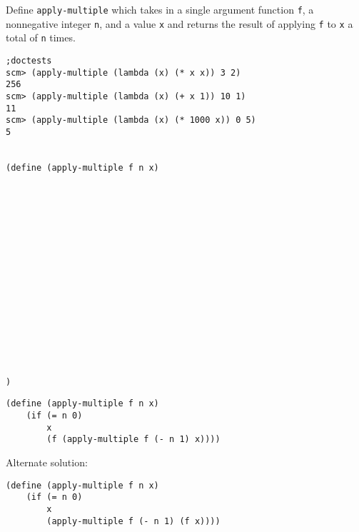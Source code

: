 \question Define \lstinline{apply-multiple} which takes in a single argument function \lstinline{f},
a nonnegative integer \lstinline{n}, and a value \lstinline{x} and returns the result of applying
\lstinline{f} to \lstinline{x} a total of \lstinline{n} times.

\begin{lstlisting}
;doctests
scm> (apply-multiple (lambda (x) (* x x)) 3 2)
256
scm> (apply-multiple (lambda (x) (+ x 1)) 10 1)
11
scm> (apply-multiple (lambda (x) (* 1000 x)) 0 5)
5


(define (apply-multiple f n x)

















)
\end{lstlisting}
\begin{solution}
\begin{lstlisting}
(define (apply-multiple f n x)
    (if (= n 0)
        x
        (f (apply-multiple f (- n 1) x))))
\end{lstlisting}

Alternate solution:

\begin{lstlisting}
(define (apply-multiple f n x)
    (if (= n 0)
        x
        (apply-multiple f (- n 1) (f x))))
\end{lstlisting}


\end{solution}
